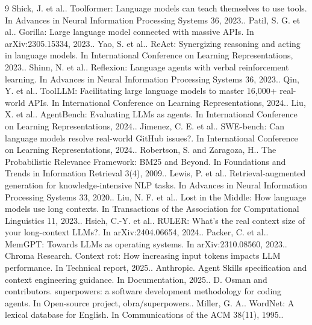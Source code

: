 \documentclass[sigconf,acmsmall]{acmart}
\begin{document}
\begin{thebibliography}{9}
Shick, J. et al.. Toolformer: Language models can teach themselves to use tools. In Advances in Neural Information Processing Systems 36, 2023..
Patil, S. G. et al.. Gorilla: Large language model connected with massive APIs. In arXiv:2305.15334, 2023..
Yao, S. et al.. ReAct: Synergizing reasoning and acting in language models. In International Conference on Learning Representations, 2023..
Shinn, N. et al.. Reflexion: Language agents with verbal reinforcement learning. In Advances in Neural Information Processing Systems 36, 2023..
Qin, Y. et al.. ToolLLM: Facilitating large language models to master 16,000+ real-world APIs. In International Conference on Learning Representations, 2024..
Liu, X. et al.. AgentBench: Evaluating LLMs as agents. In International Conference on Learning Representations, 2024..
Jimenez, C. E. et al.. SWE-bench: Can language models resolve real-world GitHub issues?. In International Conference on Learning Representations, 2024..
Robertson, S. and Zaragoza, H.. The Probabilistic Relevance Framework: BM25 and Beyond. In Foundations and Trends in Information Retrieval 3(4), 2009..
Lewis, P. et al.. Retrieval-augmented generation for knowledge-intensive NLP tasks. In Advances in Neural Information Processing Systems 33, 2020..
Liu, N. F. et al.. Lost in the Middle: How language models use long contexts. In Transactions of the Association for Computational Linguistics 11, 2023..
Hsieh, C.-Y. et al.. RULER: What's the real context size of your long-context LLMs?. In arXiv:2404.06654, 2024..
Packer, C. et al.. MemGPT: Towards LLMs as operating systems. In arXiv:2310.08560, 2023..
Chroma Research. Context rot: How increasing input tokens impacts LLM performance. In Technical report, 2025..
Anthropic. Agent Skills specification and context engineering guidance. In Documentation, 2025..
D. Osman and contributors. superpowers: a software development methodology for coding agents. In Open-source project, obra/superpowers..
Miller, G. A.. WordNet: A lexical database for English. In Communications of the ACM 38(11), 1995..
\end{thebibliography}
\end{document}
